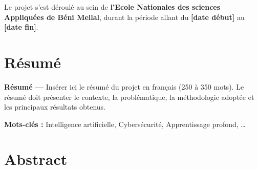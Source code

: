 \documentclass[12pt, a4paper, oneside]{report}
\begin{document}
Le projet s'est déroulé au sein de \textbf{l'Ecole Nationales des sciences Appliquées de Béni Mellal}, durant la période allant du \textbf{[date début]} au \textbf{[date fin]}.

\vfill


\chapter*{Résumé}

\begin{tcolorbox}[colback=iacsLight!30, colframe=iacsPrimary, boxrule=0.5pt, arc=3pt]
  \textbf{Résumé ---}
  Insérer ici le résumé du projet en français (250 à 350 mots). Le résumé doit présenter le contexte, la problématique, la méthodologie adoptée et les principaux résultats obtenus.

  \vspace{6pt}
  \textbf{Mots-clés :} Intelligence artificielle, Cybersécurité, Apprentissage profond, \ldots
\end{tcolorbox}

\vspace{1cm}


%
%


\chapter*{Abstract}
\end{document}
